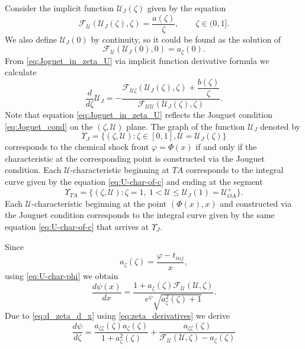 \documentclass[12pt]{article}
\renewcommand{\leq}{\leqslant}
\theoremstyle{definition}
\begin{document}
Consider the implicit function $\mathcal U_{J}(\zeta)$ given by the equation
\begin{equation}
    \label{eq:Joguet_in_zeta_U}
\mathcal F_{\mathcal U}(\mathcal U_{J}(\zeta), \zeta) = \frac{a(\zeta)}\zeta, \qquad \zeta\in(0,1].
\end{equation}
We also define $\mathcal U_J(0)$ by continuity, so it could be found as the solution of 
$$\mathcal F_{\mathcal U}(\mathcal U_{J}(0), 0) = a_\zeta(0).$$
From \eqref{eq:Joguet_in_zeta_U} via implicit function derivative formula we calculate
\begin{equation}
\label{eq:d-dzeta-U-Phi}
\dfrac{d}{d\zeta} \mathcal U_J = -\dfrac{\mathcal F_{\mathcal U \zeta}(\mathcal U_J(\zeta), \zeta) + \dfrac{b(\zeta)}{\zeta}}{\mathcal F_{\mathcal U\mathcal U}(\mathcal U_J(\zeta), \zeta)}.
\end{equation}
Note that equation \eqref{eq:Joguet_in_zeta_U} reflects the Jouguet condition \eqref{eq:Joguet_cond} on the $(\zeta, \mathcal U)$ plane. The graph of the function $\mathcal U_J$ denoted by 
$$\Upsilon_J = \{(\zeta, \mathcal U): \zeta\in[0,1], \mathcal U = \mathcal U_J(\zeta)\}$$ 
corresponds to the chemical shock front $\varphi = \Phi(x)$ if and only if the characteristic at the corresponding point is constructed via the Jouguet condition. Each $\mathcal U$-characteristic beginning at $TA$ corresponds to the integral curve given by the equation \eqref{eq:U-char-of-c} and ending at the segment 
$$\Upsilon_{TA} = \{(\zeta, \mathcal U)\colon \zeta = 1,\ 1<\mathcal U \leq \mathcal U_J(1) = \mathcal U_{OA}^+\}.$$ 
Each $\mathcal U$-characteristic beginning at the point $(\Phi(x), x)$ and constructed via the Jouguet condition corresponds to the integral curve given by the same equation \eqref{eq:U-char-of-c} that arrives at $\Upsilon_J$.

Since
\begin{equation}
\label{eq:a_zeta}
a_\zeta(\zeta) = \frac{\varphi - t_{inj}}x,
\end{equation}
using \eqref{eq:U-char-phi} we obtain
\begin{equation}
\label{eq:psi-eqn}
\frac{d\psi(x)}{dx} = \frac{1 + a_\zeta(\zeta)\mathcal F_{\mathcal U}(\mathcal U, \zeta)}{e^\psi\sqrt{a_\zeta^2(\zeta)+1}}.
\end{equation}
Due to \eqref{eq:d_zeta_d_x} using \eqref{eq:zeta_derivatives} we derive 
\begin{equation}
\label{eq:d_psi_d_zeta}
    \frac{d\psi}{d\zeta} = \frac{a_{\zeta\zeta}(\zeta)a_\zeta(\zeta)}{1 + a_\zeta^2(\zeta)} + \frac{a_{\zeta\zeta}(\zeta)}{\mathcal F_{\mathcal U}(\mathcal U, \zeta) - a_\zeta(\zeta)}
\end{equation}
\end{document}

